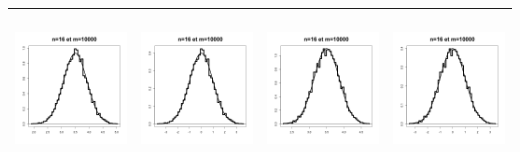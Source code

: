 \documentclass[10pt]{report}
\begin{document}
\begin{exercice}
\begin{enumerate}
\begin{tabular}{|c|c|c|c|}
\includegraphics[width=4cm,height=4cm]{img/n16MoyDes} & \includegraphics[width=4cm,height=4cm]{img/n16DeltaMoyDes} & \includegraphics[width=4cm,height=4cm]{img/n16MoyUnifs} & \includegraphics[width=4cm,height=4cm]{img/n16DeltaMoyUnifs}\\\hline

\end{tabular}
\end{enumerate}
\end{exercice}
\end{document}
